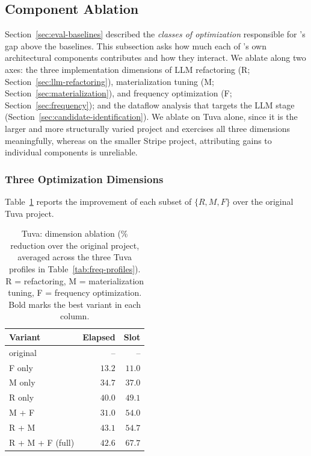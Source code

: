 \subsection{Component Ablation}
\label{sec:eval-attribution}

Section~\ref{sec:eval-baselines} described the \emph{classes of optimization} responsible for \tool{}'s gap above the baselines. This subsection asks how much each of \tool{}'s own architectural components contributes and how they interact.
We ablate along two axes: the three implementation dimensions of LLM refactoring (R; Section~\ref{sec:llm-refactoring}), materialization tuning (M; Section~\ref{sec:materialization}), and frequency optimization (F; Section~\ref{sec:frequency}); and the dataflow analysis that targets the LLM stage (Section~\ref{sec:candidate-identification}). We ablate on Tuva alone, since it is the larger and more structurally varied project and exercises all three dimensions meaningfully, whereas on the smaller Stripe project, attributing gains to individual components is unreliable. 

\subsubsection{Three Optimization Dimensions}
\label{sec:eval-ablation-rmf}

Table~\ref{tab:ablation-rmf} reports the improvement of each subset of $\{R, M, F\}$ over the original Tuva project.

\begin{table}[tb]
\centering
\caption{Tuva: dimension ablation (\% reduction over the original project, averaged across the three Tuva profiles in Table~\ref{tab:freq-profiles}). R = refactoring, M = materialization tuning, F = frequency optimization. Bold marks the best variant in each column. }
\inv
\label{tab:ablation-rmf}
\small
\begin{tabular}{lrr}
\toprule
Variant & Elapsed & Slot \\
\midrule
original         & --              & --              \\
F only           & $13.2$          & $11.0$          \\
M only           & $34.7$          & $37.0$          \\
R only           & $40.0$          & $49.1$          \\
M + F            & $31.0$          & $54.0$          \\
R + M            & $\mathbf{43.1}$          & $54.7$          \\
R + M + F (full) & $42.6$ & $\mathbf{67.7}$ \\
\bottomrule
\end{tabular}
\inv
\end{table}

